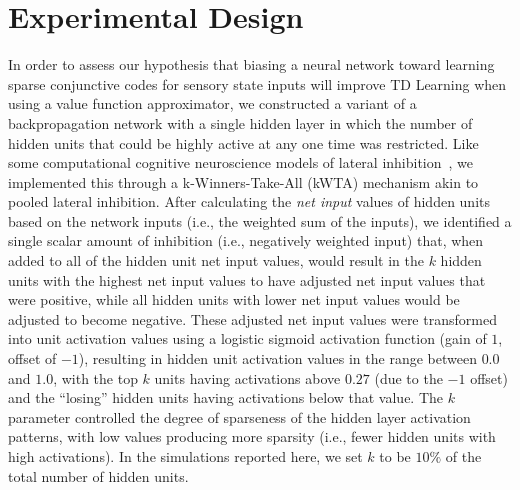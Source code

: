 \documentclass[preprint,12pt,authoryear]{elsarticle}
\begin{document}


\section{Experimental Design} %
\label{sec:experimental_design}


In order to assess our hypothesis that biasing a neural network toward
learning sparse conjunctive codes for sensory state inputs will
improve TD Learning when using a value function approximator, we
constructed a variant of a backpropagation network with a single
hidden layer in which the number of hidden units that could be highly
active at any one time was restricted. Like some computational
cognitive neuroscience models of lateral
inhibition~\citep{OReillyRC:2001:CECN}, we implemented this through a
k-Winners-Take-All (kWTA) mechanism akin to pooled lateral
inhibition. After calculating the \emph{net input} values of hidden
units based on the network inputs (i.e., the weighted sum of the
inputs), we identified a single scalar amount of inhibition (i.e.,
negatively weighted input) that, when added to all of the hidden unit
net input values, would result in the $k$ hidden units with the
highest net input values to have adjusted net input values that were
positive, while all hidden units with lower net input values would be
adjusted to become negative. These adjusted net input values were
transformed into unit activation values using a logistic sigmoid
activation function (gain of $1$, offset of $-1$), resulting in hidden
unit activation values in the range between $0.0$ and $1.0$, with the
top $k$ units having activations above $0.27$ (due to the $-1$ offset)
and the ``losing'' hidden units having activations below that
value. The $k$ parameter controlled the degree of sparseness of the
hidden layer activation patterns, with low values producing more
sparsity (i.e., fewer hidden units with high activations). In the
simulations reported here, we set $k$ to be $10\%$ of the total number
of hidden units.
\end{document}
